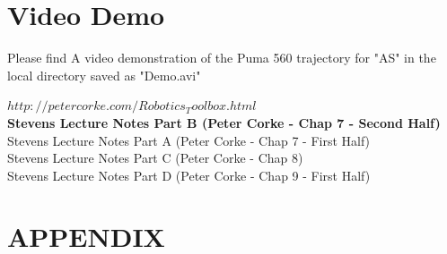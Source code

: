\documentclass[a4paper, 10pt]{article}
\begin{document}

\section{Video Demo}

Please find A video demonstration of the Puma 560 trajectory for "AS" in the local directory saved as "Demo.avi"



\nocite{*}


$http://petercorke.com/Robotics_Toolbox.html$
\\
\textbf{Stevens Lecture Notes Part B (Peter Corke - Chap 7 - Second Half)}
\\
Stevens Lecture Notes Part A (Peter Corke - Chap 7 - First Half)
\\
Stevens Lecture Notes Part C (Peter Corke - Chap 8)
\\
Stevens Lecture Notes Part D (Peter Corke - Chap 9 - First Half)


\clearpage
\section*{APPENDIX}
\end{document}
